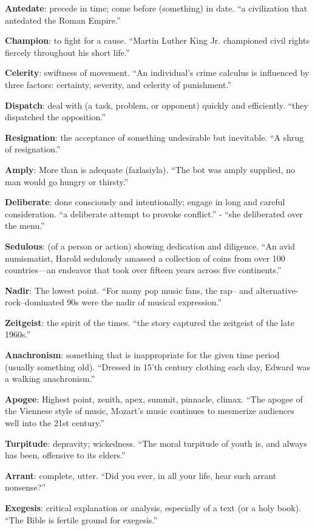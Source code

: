 \documentclass[12pt, a4paper]{ximera}
\begin{document}
\textbf{Antedate}: precede in time; come before (something) in date. ``a civilization that antedated the Roman Empire.''

\textbf{Champion}: to fight for a cause. ``Martin Luther King Jr. championed civil rights fiercely throughout his short life.''

\textbf{Celerity}: swiftness of movement. ``An individual's crime calculus is influenced by three factors: certainty, severity, and celerity of punishment.''

\textbf{Dispatch}: deal with (a task, problem, or opponent) quickly and efficiently. ``they dispatched the opposition.''

\textbf{Resignation}: the acceptance of something undesirable but inevitable. ``A shrug of resignation.''

\textbf{Amply}: More than is adequate (fazlasiyla). ``The bot was amply supplied, no man would go hungry or thirsty.''

\textbf{Deliberate}: done consciously and intentionally; engage in long and careful consideration. ``a deliberate attempt to provoke conflict.'' - ``she deliberated over the menu.''

\textbf{Sedulous}: (of a person or action) showing dedication and diligence. ``An avid numismatist, Harold sedulously amassed a collection of coins from over 100 countries—an endeavor that took over fifteen years across five continents.''

\textbf{Nadir}: The lowest point. ``For many pop music fans, the rap– and alternative-rock–dominated 90s were the nadir of musical expression.''

\textbf{Zeitgeist}: the spirit of the times. ``the story captured the zeitgeist of the late 1960s.''

\textbf{Anachronism}: something that is inappropriate for the given time period (usually something old). ``Dressed in 15'th century clothing each day, Edward was a walking anachronism.''

\textbf{Apogee}: Highest point, zenith, apex, summit, pinnacle, climax. ``The apogee of the Viennese style of music, Mozart’s music continues to mesmerize audiences well into the 21st century.''

\textbf{Turpitude}: depravity; wickedness. ``The moral turpitude of youth is, and always has been, offensive to its elders.''

\textbf{Arrant}: complete, utter. ``Did you ever, in all your life, hear such arrant nonsense?''

\textbf{Exegesis}: critical explanation or analysis, especially of a text (or a holy book). ``The Bible is fertile ground for exegesis.''
\end{document}
